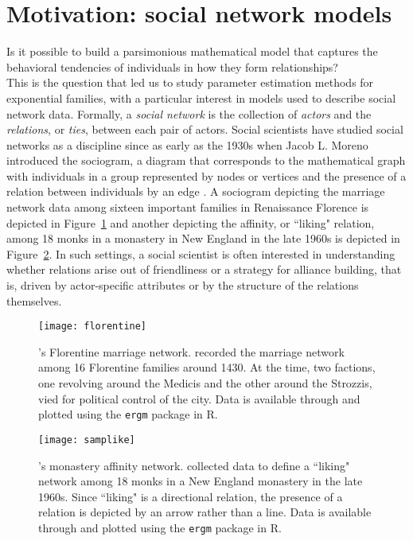 \section{Motivation: social network models}
Is it possible to build a parsimonious mathematical model that captures the 
behavioral tendencies of individuals in how they form relationships?\\  %

This is the question that led us to study parameter estimation methods for exponential 
families, with a particular interest in models used to describe social network data.  
Formally, a \emph{social network} is the collection of \emph{actors} and the 
\emph{relations}, or \emph{ties}, between each pair of actors.
Social scientists have studied social networks as a discipline since as early as the 
1930s when Jacob L. Moreno introduced the sociogram, a diagram that corresponds to
the mathematical graph with individuals in a group 
represented by nodes or vertices and the presence of a relation between 
individuals by an edge \citep[Chapter 3]{Wasserman:1994}.  
A sociogram depicting the marriage network data among sixteen 
important families in Renaissance Florence \citep{Padgett} is depicted in 
Figure~\ref{F:Florentine} and another depicting the affinity, or ``liking" relation, among 18 
monks in a monastery in New England in the late 1960s \citep{Sampson} is depicted in 
Figure~\ref{F:Sampson}.  In such settings, a social scientist is often interested in 
understanding whether relations arise out of friendliness or a strategy for alliance 
building, that is, driven by actor-specific attributes or by the structure of  the relations themselves.
\begin{figure}[h!]
\begin{center}
\texttt{[image: florentine]} %
\end{center}
\caption[\citeauthor{Padgett}'s \citeyearpar{Padgett} Florentine marriage network]{
\citeauthor{Padgett}'s \citeyearpar{Padgett} Florentine marriage network.  \citeauthor{Padgett} recorded the marriage network among 16 Florentine families around 1430.  At the time, two factions, one revolving around the 
Medicis and the other around the Strozzis, vied for political control of the city.   
Data is available through and plotted using the \texttt{ergm} package \citep*{ergm:R} in 
R.}
\label{F:Florentine}
\end{figure}

\begin{figure}[h!]
\begin{center}
\texttt{[image: samplike]}
\end{center}
\caption[\citeauthor{Sampson}'s \citeyearpar{Sampson} monastery affinity network]
{\citeauthor{Sampson}'s \citeyearpar{Sampson} monastery affinity network.  \citeauthor{Sampson} collected data to define a ``liking" network among 18 monks 
in a New England monastery in the late 1960s.  Since ``liking" is a directional 
relation, the presence of a relation is depicted by an arrow rather than a line.  Data 
is available through and plotted using the \texttt{ergm} package \citep{ergm:R} in R.}
\label{F:Sampson}
\end{figure}


